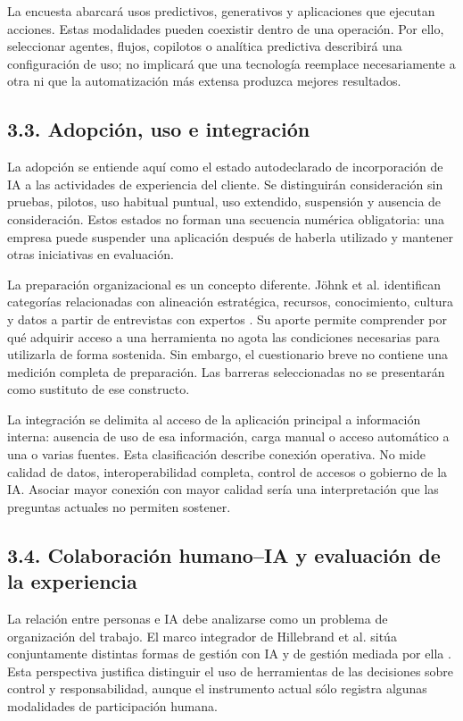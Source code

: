\documentclass[12pt,letterpaper]{article}
\begin{document}
La encuesta abarcará usos predictivos, generativos y aplicaciones que ejecutan acciones. Estas modalidades pueden coexistir dentro de una operación. Por ello, seleccionar agentes, flujos, copilotos o analítica predictiva describirá una configuración de uso; no implicará que una tecnología reemplace necesariamente a otra ni que la automatización más extensa produzca mejores resultados.

\subsection*{3.3. Adopción, uso e integración}
La adopción se entiende aquí como el estado autodeclarado de incorporación de IA a las actividades de experiencia del cliente. Se distinguirán consideración sin pruebas, pilotos, uso habitual puntual, uso extendido, suspensión y ausencia de consideración. Estos estados no forman una secuencia numérica obligatoria: una empresa puede suspender una aplicación después de haberla utilizado y mantener otras iniciativas en evaluación.

La preparación organizacional es un concepto diferente. Jöhnk et al. identifican categorías relacionadas con alineación estratégica, recursos, conocimiento, cultura y datos a partir de entrevistas con expertos \citep{johnk}. Su aporte permite comprender por qué adquirir acceso a una herramienta no agota las condiciones necesarias para utilizarla de forma sostenida. Sin embargo, el cuestionario breve no contiene una medición completa de preparación. Las barreras seleccionadas no se presentarán como sustituto de ese constructo.

La integración se delimita al acceso de la aplicación principal a información interna: ausencia de uso de esa información, carga manual o acceso automático a una o varias fuentes. Esta clasificación describe conexión operativa. No mide calidad de datos, interoperabilidad completa, control de accesos o gobierno de la IA. Asociar mayor conexión con mayor calidad sería una interpretación que las preguntas actuales no permiten sostener.

\subsection*{3.4. Colaboración humano--IA y evaluación de la experiencia}
La relación entre personas e IA debe analizarse como un problema de organización del trabajo. El marco integrador de Hillebrand et al. sitúa conjuntamente distintas formas de gestión con IA y de gestión mediada por ella \citep{hillebrand}. Esta perspectiva justifica distinguir el uso de herramientas de las decisiones sobre control y responsabilidad, aunque el instrumento actual sólo registra algunas modalidades de participación humana.
\end{document}
